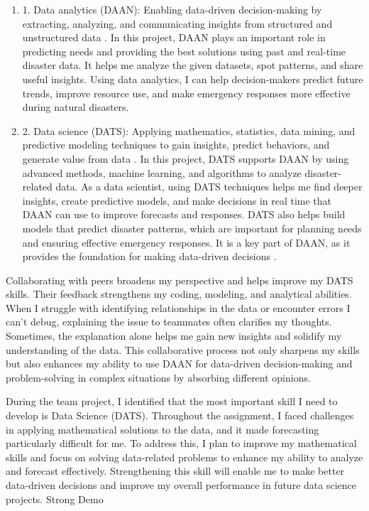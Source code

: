 \documentclass[a4paper, 11pt]{report}
\begin{document}
\begin{enumerate}
	\item 1. Data analytics (DAAN): Enabling data-driven decision-making by extracting, analyzing, and communicating insights from structured and unstructured data \cite{palma2023}. In this project, DAAN plays an important role in predicting needs and providing the best solutions using past and real-time disaster data. It helps me analyze the given datasets, spot patterns, and share useful insights. Using data analytics, I can help decision-makers predict future trends, improve resource use, and make emergency responses more effective during natural disasters.


	\item 2. Data science (DATS): Applying mathematics, statistics, data mining, and predictive modeling techniques to gain insights, predict behaviors, and generate value from data \cite{palma2023}. In this project, DATS supports DAAN by using advanced methods, machine learning, and algorithms to analyze disaster-related data. As a data scientist, using DATS techniques helps me find deeper insights, create predictive models, and make decisions in real time that DAAN can use to improve forecasts and responses. DATS also helps build models that predict disaster patterns, which are important for planning needs and ensuring effective emergency responses. It is a key part of DAAN, as it provides the foundation for making data-driven decisions \cite{anderson2008}.
\end{enumerate}

	Collaborating with peers broadens my perspective and helps improve my DATS skills. Their feedback strengthens my coding, modeling, and analytical abilities. When I struggle with identifying relationships in the data or encounter errors I can't debug, explaining the issue to teammates often clarifies my thoughts. Sometimes, the explanation alone helps me gain new insights and solidify my understanding of the data. This collaborative process not only sharpens my skills but also enhances my ability to use DAAN for data-driven decision-making and problem-solving in complex situations by absorbing different opinions.

	During the team project, I identified that the most important skill I need to develop is Data Science (DATS). Throughout the assignment, I faced challenges in applying mathematical solutions to the data, and it made forecasting particularly difficult for me. To address this, I plan to improve my mathematical skills and focus on solving data-related problems to enhance my ability to analyze and forecast effectively. Strengthening this skill will enable me to make better data-driven decisions and improve my overall performance in future data science projects.
Strong Demo
\end{document}
